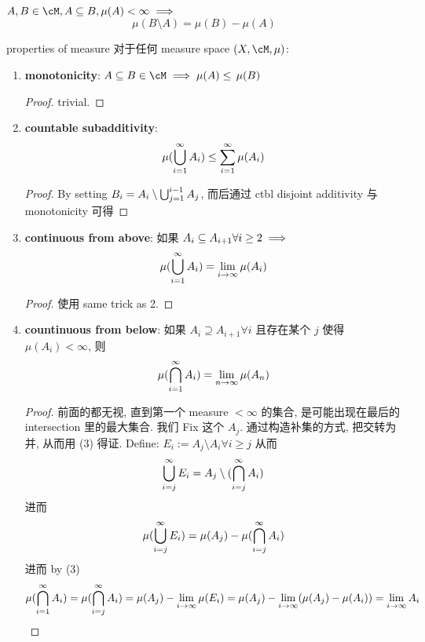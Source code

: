 \documentclass[lang=cn,11pt]{elegantbook}
\begin{document}
\begin{corollary}
    $A,B\in \cM, A\sub B, \mu(A) < \infty \implies$
    $$
    \mu(B\setminus A) = \mu(B) - \mu(A)
    $$
\end{corollary}




\begin{theorem}{properties of measure}
    对于任何 measure space $(X,\cM, \mu)$:
    \begin{enumerate}
        \item \textbf{monotonicity}: $A \sub B \in \cM \implies \mu(A) \leq \,\mu(B)$
        \begin{proof}
            trivial.
        \end{proof}
        \item \textbf{countable subadditivity}: 
        $$
        \mu(\bigcup_{i=1}^\infty A_i) \leq \sum_{i=1}^\infty \mu(A_i)
        $$
        \begin{proof}
            By setting $B_i = A_i \setminus \bigcup_{j=1}^{i-1} A_j$, 而后通过 ctbl disjoint additivity 与 monotonicity 可得
        \end{proof}
        \item \textbf{continuous from above}: 
        如果 $A_i \subseteq A_{i+1} \forall i \geq 2\implies $
        $$
        \mu(\bigcup_{i=1}^{\infty}A_i   ) = \lim_{i \rightarrow \infty} \mu(A_i)
        $$
        \begin{proof}
            使用 same trick as 2.
        \end{proof}
        \item \textbf{countinuous from below}:
        如果 $A_i \supseteq A_{i+1} \forall i$ 且存在某个 $j$ 使得 $\mu(A_i) < \infty$, 则
        $$
        \mu(\bigcap_{i=1}^{\infty}A_i) = \lim_{n \rightarrow \infty} \mu(A_n)
        $$
        \begin{proof}
            前面的都无视, 直到第一个 measure $< \infty$ 的集合, 是可能出现在最后的 intersection 里的最大集合. 我们 Fix 这个 $A_j$. 通过构造补集的方式, 把交转为并, 从而用 (3) 得证.
            Define:
            $
            E_i := A_j \setminus A_i \forall i \geq j
            $
            从而
            $$
            \bigcup_{i=j}^\infty E_i = A_j \setminus (\bigcap_{i=j}^\infty A_i)
            $$进而 
            $$
            \mu( \bigcup_{i=j}^\infty E_i) = \mu(A_j) - \mu(\bigcap_{i=j}^\infty A_i)
            $$
            进而 by (3)
            $$
            \mu(\bigcap_{i=1}^\infty A_i) = \mu(\bigcap_{i=j}^\infty A_i) = \mu(A_j) - \lim_{i\rightarrow \infty}\mu(E_i)  = \mu(A_j) - \lim_{i\rightarrow \infty}(\mu(A_j) - \mu(A_i))
            = \lim_{i\rightarrow \infty} A_i
            $$
            
        \end{proof}
    \end{enumerate}
\end{theorem}
\end{document}
